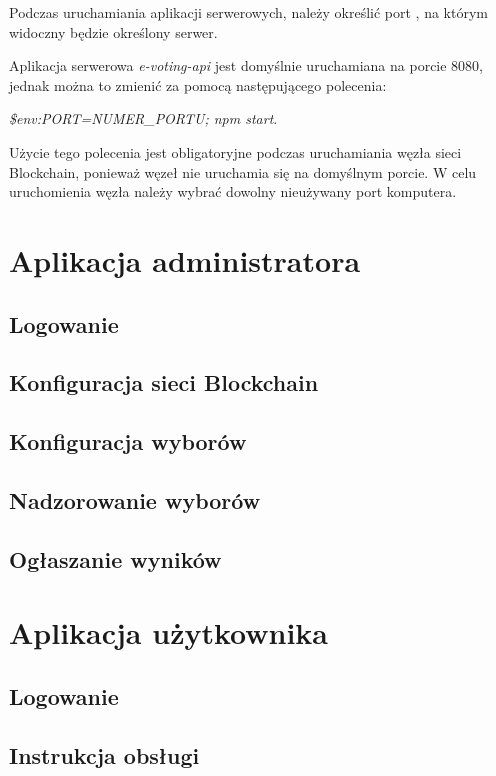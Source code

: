 \documentclass[a4paper,12pt]{book}
\begin{document}
Podczas uruchamiania aplikacji serwerowych, należy określić port , na którym widoczny będzie określony serwer.

Aplikacja serwerowa \textit{e-voting-api} jest domyślnie uruchamiana na porcie 8080, jednak można to zmienić za pomocą następującego polecenia:

\textit{\$env:PORT=NUMER\_PORTU; npm start}.

Użycie tego polecenia jest obligatoryjne podczas uruchamiania węzła sieci Blockchain, ponieważ węzeł nie uruchamia się na domyślnym porcie. W celu uruchomienia węzła należy wybrać dowolny nieużywany port komputera.

\section{Aplikacja administratora}

\subsection{Logowanie}

\subsection{Konfiguracja sieci Blockchain}

\subsection{Konfiguracja wyborów}

\subsection{Nadzorowanie wyborów}

\subsection{Ogłaszanie wyników}

\section{Aplikacja użytkownika}

\subsection{Logowanie}

\subsection{Instrukcja obsługi}
\end{document}
